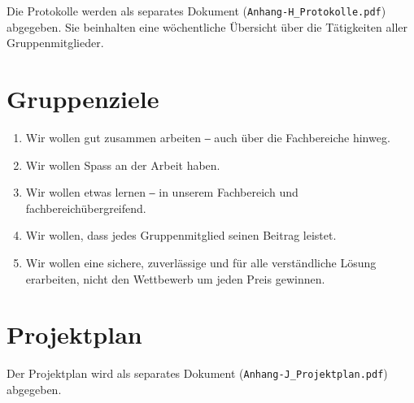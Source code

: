Die Protokolle werden als separates Dokument (\texttt{Anhang-H\_Protokolle.pdf}) abgegeben. Sie beinhalten eine wöchentliche Übersicht über die Tätigkeiten aller Gruppenmitglieder.

\section{Gruppenziele}
\label{app:gruppenziele}

\begin{enumerate}[leftmargin=*]
\setlength\itemsep{0.2em}
\item Wir wollen gut zusammen arbeiten ‒ auch über die Fachbereiche hinweg.
\item Wir wollen Spass an der Arbeit haben.
\item Wir wollen etwas lernen ‒ in unserem Fachbereich und fachbereichübergreifend.
\item Wir wollen, dass jedes Gruppenmitglied seinen Beitrag leistet.
\item Wir wollen eine sichere, zuverlässige und für alle verständliche Lösung erarbeiten, nicht den Wettbewerb um jeden Preis gewinnen.
\end{enumerate}

\section{Projektplan}
\label{app:projektplan}

Der Projektplan wird als separates Dokument (\texttt{Anhang-J\_Projektplan.pdf}) abgegeben.
